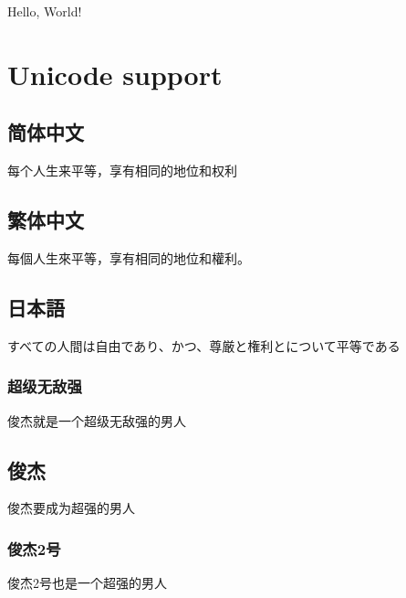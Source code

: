 \documentclass[a4paper]{article}
\begin{document}
	
	Hello, World!
	
\section{Unicode support}
\subsection{简体中文}
每个人生来平等，享有相同的地位和权利

\subsection{繁体中文}
每個人生來平等，享有相同的地位和權利。

\subsection{日本語}
すべての人間は自由であり、かつ、尊厳と権利とについて平等である

\subsubsection{超级无敌强}
俊杰就是一个超级无敌强的男人

\subsection{俊杰}
俊杰要成为超强的男人
\subsubsection{俊杰2号}
俊杰2号也是一个超强的男人
\end{document}
